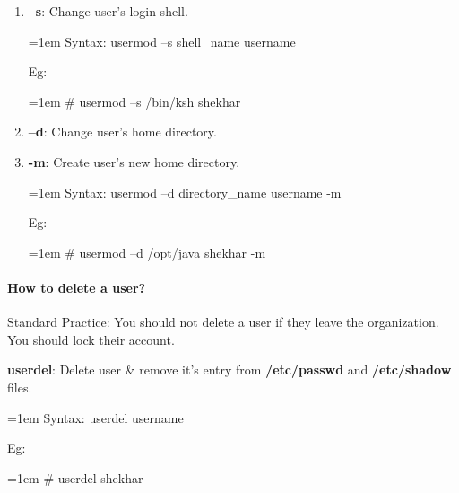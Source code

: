 \begin{flushleft}
\begin{enumerate}[label=(\alph*)]
		\item \textbf{–s}: Change user's login shell.
		\bigskip
		\begin{tcolorbox}[breakable,notitle,boxrule=0pt,colback=pink,colframe=pink]
			\color{black}
			\font=1em
			Syntax: usermod –s shell\_name username
			\font=4pt
		\end{tcolorbox}
		Eg:
		\bigskip
		\begin{tcolorbox}[breakable,notitle,boxrule=-0pt,colback=black,colframe=black]
			\color{green}
			\font=1em
			\# usermod –s /bin/ksh shekhar
			\font=4pt
		\end{tcolorbox}
		
		\newpage
		\item \textbf{–d}: Change user's home directory.
		\item \textbf{-m}: Create user's new home directory.
		\bigskip
		\begin{tcolorbox}[breakable,notitle,boxrule=0pt,colback=pink,colframe=pink]
			\color{black}
			\font=1em
			Syntax: usermod –d directory\_name username -m
			\font=4pt
		\end{tcolorbox}
		Eg:
		\bigskip
		\begin{tcolorbox}[breakable,notitle,boxrule=-0pt,colback=black,colframe=black]
			\color{green}
			\font=1em
			\# usermod –d /opt/java shekhar -m
			\font=4pt
		\end{tcolorbox}
	\end{enumerate}
	
	\bigskip
	\bigskip
	
	\newpage
	
	\paragraph{How to delete a user?}
	
	\bigskip
	\begin{tcolorbox}[breakable,notitle,boxrule=-0pt,colback=red,colframe=red]
		\color{white}
		Standard Practice: You should not delete a user if they leave	 the organization. You
		should lock their account.
	\end{tcolorbox}
	
	
	
	\textbf{userdel}: Delete user \& remove it's entry from \textbf{/etc/passwd} and \textbf{/etc/shadow} files.
	\begin{tcolorbox}[breakable,notitle,boxrule=0pt,colback=pink,colframe=pink]
		\color{black}
		\font=1em
		Syntax: userdel username
		\font=4pt
	\end{tcolorbox}
	Eg:
	\begin{tcolorbox}[breakable,notitle,boxrule=-0pt,colback=black,colframe=black]
		\color{green}
		\font=1em
		\# userdel shekhar
		\font=4pt
	\end{tcolorbox}


\end{flushleft}
